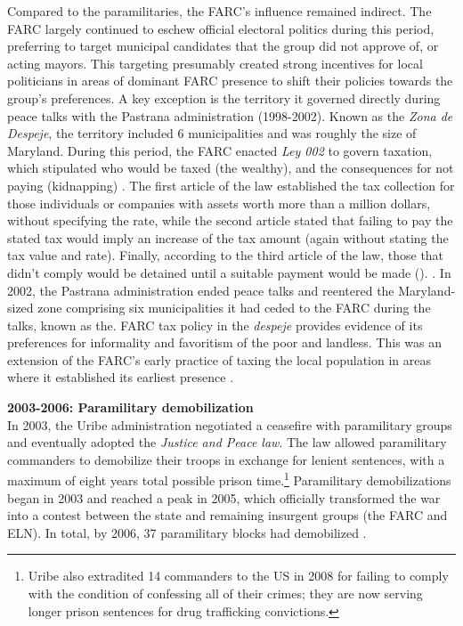 Compared to the paramilitaries, the FARC's influence remained indirect. The FARC largely continued to eschew official electoral politics during this period, preferring to target municipal candidates that the group did not approve of, or acting mayors. This targeting presumably created strong incentives for local politicians in areas of dominant FARC presence to shift their policies towards the group's preferences. A key exception is the territory it governed directly during peace talks with the Pastrana administration (1998-2002). Known as the \emph{Zona de Despeje}, the territory included 6 municipalities and was roughly the size of Maryland. During this period, the FARC enacted \emph{Ley 002} to govern taxation, which stipulated who would be taxed (the wealthy), and the consequences for not paying (kidnapping) \citep{farcley2005}. The first article of the law established the tax collection for those individuals or companies with assets worth more than a million dollars, without specifying the rate, while the second article stated that failing to pay the stated tax would imply an increase of the tax amount (again without stating the tax value and rate). Finally, according to the third article of the law, those that didn't comply would be detained until a suitable payment would be made (\citet{farcley2005}). . In 2002, the Pastrana administration ended peace talks and reentered the Maryland-sized zone comprising six municipalities it had ceded to the FARC during the talks, known as the. FARC tax policy in the \emph{despeje} provides evidence of its preferences for informality and favoritism of the poor and landless.
This was an extension of the FARC's early practice of taxing the local population in areas where it established its earliest presence \citep{molano87a}. 

\textbf{2003-2006: Paramilitary demobilization} \\
In 2003, the Uribe administration negotiated a ceasefire with paramilitary groups and eventually adopted the {\it Justice and Peace law}. The law allowed paramilitary commanders to demobilize their troops in exchange for lenient sentences, with a maximum of eight years total possible prison time.\footnote{Uribe also extradited 14 commanders to the US in 2008 for failing to comply with the condition of confessing all of their crimes; they are now serving longer prison sentences for drug trafficking convictions.} 
Paramilitary demobilizations began in 2003 and reached a peak in 2005, which officially transformed the war into a contest between the state and remaining insurgent groups (the FARC and ELN). In total, by 2006, 37 paramilitary blocks had demobilized \citep{altocomisionado06}. 

